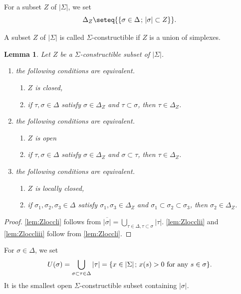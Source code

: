 \documentclass[JEP,XML,SOM,Unicode]{cedram}
\newenvironment{enumeratei}
{\bgroup\def\theenumi{\roman{enumi}}\def\theenumii{\alph{enumii}}\begin{enumerate}}
{\end{enumerate}\egroup}
\let\ol\overline
\newcommand{\semicolon}{\nobreak \mskip2mu\mathpunct{}\nonscript\mkern-\thinmuskip{;}\mskip6mu plus1mu\relax}
\newcommand{\set}[2]{{\left\{#1\semicolon #2 \right\}}}
\theoremstyle{plain}
\newtheorem{lemma}[theorem]{Lemma}
\theoremstyle{definition}
\newcommand{\st}[1]{{\{{#1}\}}}
\begin{document}
For a subset $Z$ of $|\Sigma|$,
we set \[\Delta_Z\seteq\set{\sigma\in \Delta}{|\sigma|\subset Z}.\]

A subset $Z$ of $|\Sigma|$ is called $\Sigma$-constructible if
$Z$ is a union of simplexes.

\begin{lemma}\label{lem:Zloccl}
Let $Z$ be a $\Sigma$-constructible subset of $|\Sigma|$.
\begin{enumeratei}
\item\label{lem:Zloccli} the following conditions are equivalent.
\begin{enumerate}
\item\label{lem:Zlocclia} $Z$ is closed,
\item\label{lem:Zlocclib}
if $\tau, \sigma\in\Delta$ satisfy
$\sigma\in\Delta_Z$ and $\tau\subset \sigma$, then
$\tau\in \Delta_Z$.
\end{enumerate}
\item\label{lem:Zlocclii} the following conditions are equivalent.
\begin{enumerate}
\item\label{lem:Zloccliia} $Z$ is open
\item\label{lem:Zloccliib}
if $\tau, \sigma\in\Delta$ satisfy
$\sigma\in\Delta_Z$ and $\sigma\subset \tau$, then
$\tau\in \Delta_Z$.
\end{enumerate}
\item\label{lem:Zloccliii} the following conditions are equivalent.
\begin{enumerate}
\item\label{lem:Zloccliiia} $Z$ is locally closed,
\item\label{lem:Zloccliiib}
if $\sigma_1, \sigma_2,\sigma_3\in\Delta$ satisfy
$\sigma_1,\sigma_3\in\Delta_Z$ and $\sigma_1\subset \sigma_2\subset \sigma_3$,
then
$\sigma_2\in \Delta_Z$.
\end{enumerate}
\end{enumeratei}
\end{lemma}

\begin{proof}
\eqref{lem:Zloccli} follows from $\ol{|\sigma|}=\bigcup_{\tau\in\Delta,\tau\subset\sigma}|\tau|$.
\eqref{lem:Zlocclii} and \eqref{lem:Zloccliii} follow from \eqref{lem:Zloccli}.
\end{proof}

For $\sigma\in\Delta$, we set
\[U(\sigma)=\bigcup_{\sigma\subset \tau\in\Delta}|\tau| = \st{x\in|\Sigma|\semicolon x(s)>0\text{ for any } s\in\sigma}.\]
It is the smallest open $\Sigma$-constructible subset containing $|\sigma|$.
\end{document}
